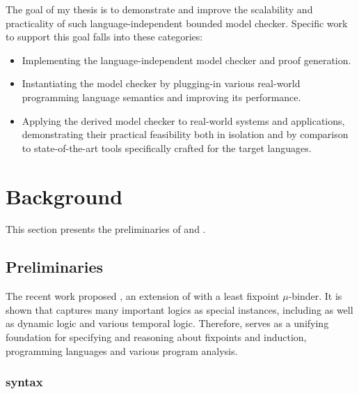\documentclass{almostllncs}
\begin{document}
The goal of my thesis is to demonstrate and improve the scalability and
practicality of such language-independent bounded model checker.
Specific work to support this goal falls into these categories:

\begin{itemize}
\item Implementing the language-independent model checker and proof generation.
\item Instantiating the model checker by plugging-in various real-world programming language semantics and improving its performance.
\item Applying the derived model checker to real-world systems and applications, demonstrating their practical feasibility both in isolation and by comparison to state-of-the-art tools specifically crafted for the target languages.
\end{itemize}

\section{Background}
This section presents the preliminaries of \mmul and \modmul.

\subsection{\MmuL Preliminaries}
The recent work \cite{chen-rosu-2019-lics} proposed \mmul, an extension of \ml \cite{matching-logic-17} with a least fixpoint $\mu$-binder.
It is shown that \mmul captures many important logics as special instances, including \modmul as well as dynamic logic and various temporal logic.
Therefore, \mmul serves as a unifying foundation for specifying and reasoning about fixpoints and induction, programming languages and various program analysis.

\subsubsection{\MmuL syntax}
\end{document}
